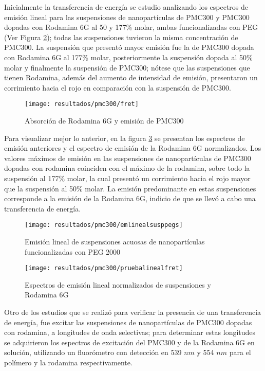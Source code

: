 Inicialmente la transferencia de energ\'ia se estudio analizando los espectros de emisi\'on lineal para las suspensiones de nanopart\'iculas de PMC300 y PMC300 dopadas con Rodamina 6G al 50 y 177\% molar, ambas funcionalizadas con PEG (Ver Figura \ref{emilinepegs}); todas las suspensiones tuvieron la misma concentraci\'on de PMC300. La suspensi\'on que present\'o mayor emisi\'on fue la de PMC300 dopada con Rodamina 6G al 177\% molar, posteriormente la suspensi\'on dopada al 50\% molar y finalmente la suspensi\'on de PMC300; n\'otese que las suspensiones que tienen Rodamina, adem\'as del aumento de intensidad de emisi\'on, presentaron un corrimiento hacia el rojo en comparaci\'on con la suspensi\'on de PMC300. 

\begin{figure}[H]
\centering
\texttt{[image: resultados/pmc300/fret]}
\caption{Absorci\'on de Rodamina 6G y emisi\'on de PMC300}\label{fretito}
\end{figure}


Para visualizar mejor lo anterior, en la figura \ref{pruebanorm} se presentan los espectros de emisi\'on anteriores y el espectro de emisi\'on de la Rodamina 6G normalizados. Los valores m\'aximos de emisi\'on en las suspensiones de nanopart\'iculas de PMC300 dopadas con rodamina coinciden con el m\'aximo de la rodamina, sobre todo la suspensi\'on al 177\% molar, la cual present\'o un corrimiento hacia el rojo mayor que la suspensi\'on al 50\% molar. La emisi\'on predominante en estas suspensiones corresponde a la emisi\'on de la Rodamina 6G, indicio de que se llev\'o a cabo una transferencia de energ\'ia.


\begin{figure}[H]
\centering
\texttt{[image: resultados/pmc300/emlinealsusppegs]}
\caption{Emisi\'on lineal de suspensiones acuosas de nanopart\'iculas funcionalizadas con PEG 2000 }\label{emilinepegs}
\end{figure}

\begin{figure}[H]
\centering
\texttt{[image: resultados/pmc300/pruebalinealfret]}
\caption{Espectros de emisi\'on lineal normalizados de suspensiones y Rodamina 6G}\label{pruebanorm}
\end{figure}

Otro de los estudios que se realiz\'o para verificar la presencia de una transferencia de energ\'ia, fue excitar las suspensiones de nanopart\'iculas de PMC300 dopadas con rodamina, a longitudes de onda selectivas; para determinar estas longitudes se adquirieron los espectros de excitaci\'on del PMC300 y de la Rodamina 6G en soluci\'on, utilizando un fluor\'ometro con detecci\'on en 539 $nm$ y 554 $nm$ para el pol\'imero y la rodamina respectivamente. 

